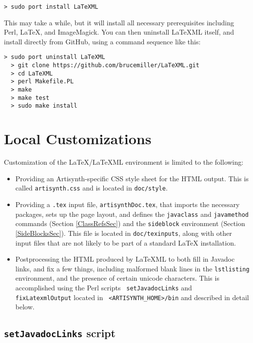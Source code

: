 \documentclass{article}
\begin{document}
\begin{lstlisting}[]
  > sudo port install LaTeXML
\end{lstlisting}

This may take a while, but it will install all necessary prerequisites
including Perl, LaTeX, and ImageMagick. You can then uninstall LaTeXML
itself, and install directly from GitHub, using a command
sequence like this:

\begin{lstlisting}[]
  > sudo port uninstall LaTeXML
  > git clone https://github.com/brucemiller/LaTeXML.git
  > cd LaTeXML
  > perl Makefile.PL
  > make
  > make test
  > sudo make install
\end{lstlisting}

\section{Local Customizations}
\label{LocalCustomizationSec}

Customization of the LaTeX/LaTeXML environment is limited to the
following:

\begin{itemize}

\item Providing an Artisynth-specific CSS style sheet for the HTML output.
This is called {\tt artisynth.css} and is located in {\tt doc/style}.

\item Providing a {\tt .tex} input file, {\tt artisynthDoc.tex}, that
imports the necessary packages, sets up the page layout, and defines
the {\tt \BKS javaclass} and {\tt \BKS javamethod} commands (Section
\ref{ClassRefsSec}) and the {\tt sideblock} environment (Section
\ref{SideBlocksSec}).  This file is located in {\tt doc/texinputs},
along with other input files that are not likely to be part of a
standard LaTeX installation.

\item Postprocessing the HTML produced by LaTeXML to both fill in
Javadoc links, and fix a few things, including malformed blank lines
in the {\tt lstlisting} environment, and the presence of certain
unicode characters.  This is accomplished using the Perl scripts {\tt
setJavadocLinks} and {\tt fixLatexmlOutput} located in {\tt
<ARTISYNTH\_HOME>/bin} and described in detail below.

\end{itemize}

\subsection{{\tt setJavadocLinks} script}
\label{setJavadocLinksSec}
\end{document}
